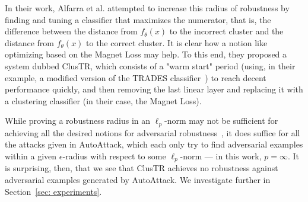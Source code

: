 In their work, Alfarra et al. attempted to increase this radius of robustness by finding and tuning a classifier that maximizes the numerator, that is, the difference between the distance from $f_\theta(x)$ to the incorrect cluster and the distance from $f_\theta(x)$ to the correct cluster. It is clear how a notion like optimizing based on the Magnet Loss may help. To this end, they proposed a system dubbed ClusTR, which consists of a "warm start" period (using, in their example, a modified version of the TRADES classifier~\cite{Zhang2019TRADES}) to reach decent performance quickly, and then removing the last linear layer and replacing it with a clustering classifier (in their case, the Magnet Loss). 

While proving a robustness radius in an $\ell_p$-norm may not be sufficient for achieving all the desired notions for adversarial robustness~\cite{Carlini2019Robustness}, it does suffice for all the attacks given in AutoAttack, which each only try to find adversarial examples within a given $\epsilon$-radius with respect to some $\ell_p$-norm — in this work, $p = \infty$. It is surprising, then, that we see that ClusTR achieves no robustness against adversarial examples generated by AutoAttack. We investigate further in Section~\ref{sec: experiments}.